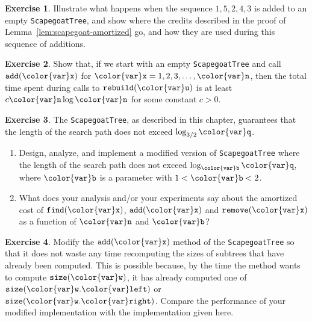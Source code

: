 \documentclass[10pt]{book}
\theoremstyle{plain}
\newcommand{\lemref}[1]{Lemma~\ref{lem:#1}}
\theoremstyle{definition}
\newtheorem{exc}{Exercise}[chapter]
\newcommand{\exclabel}[1]{\label{exc:#1}}
\begin{document}
\begin{exc}
  Illustrate what happens when the sequence $1,5,2,4,3$ is added to an
  empty \texttt{ScapegoatTree}, and show where the credits described in the
  proof of \lemref{scapegoat-amortized} go, and how they are used during
  this sequence of additions.
\end{exc}

\begin{exc}\exclabel{scapegoat-nlogn}
  Show that, if we start with an empty \texttt{ScapegoatTree} and call \ensuremath{\mathtt{add({\color{var}x})}}
  for $\ensuremath{\mathtt{{\color{var}x}}}=1,2,3,\ldots,\ensuremath{\mathtt{{\color{var}n}}}$, then the total time spent during calls to
  \ensuremath{\mathtt{rebuild({\color{var}u})}} is at least $c\ensuremath{\mathtt{{\color{var}n}}}\log \ensuremath{\mathtt{{\color{var}n}}}$ for some constant $c>0$.
\end{exc}

\begin{exc}
  The \texttt{ScapegoatTree}, as described in this chapter, guarantees that the
  length of the search path does not exceed $\log_{3/2}\ensuremath{\mathtt{{\color{var}q}}}$.
  \begin{enumerate}
    \item  Design, analyze, and implement a modified version of
      \texttt{ScapegoatTree} where the length of the search path does not exceed
      $\log_{\ensuremath{\mathtt{{\color{var}b}}}} \ensuremath{\mathtt{{\color{var}q}}}$, where \ensuremath{\mathtt{{\color{var}b}}} is a parameter with $1<\ensuremath{\mathtt{{\color{var}b}}}<2$.
    \item What does your analysis and/or your experiments say about the
      amortized cost of \ensuremath{\mathtt{find({\color{var}x})}}, \ensuremath{\mathtt{add({\color{var}x})}} and \ensuremath{\mathtt{remove({\color{var}x})}} as a function
      of \ensuremath{\mathtt{{\color{var}n}}} and \ensuremath{\mathtt{{\color{var}b}}}?
  \end{enumerate}
\end{exc}

\begin{exc}\exclabel{scapegoat-quicksize}
  Modify the \ensuremath{\mathtt{add({\color{var}x})}} method of the \texttt{ScapegoatTree} so that it does not
  waste any time recomputing the sizes of subtrees that have already
  been computed.  This is possible because, by the time the method
  wants to compute \ensuremath{\mathtt{size({\color{var}w})}}, it has already computed one of \ensuremath{\mathtt{size({\color{var}w}.{\color{var}left})}}
  or \ensuremath{\mathtt{size({\color{var}w}.{\color{var}right})}}.  Compare the performance of your modified
  implementation with the implementation given here.
\end{exc}
\end{document}
